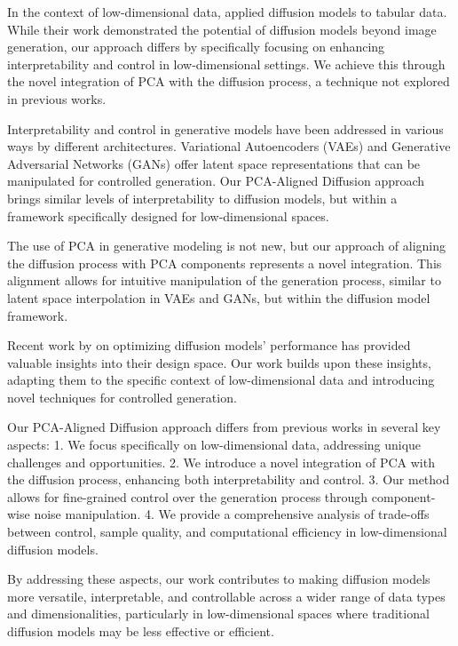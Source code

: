 \documentclass{article} %
\begin{document}
In the context of low-dimensional data, \citet{kotelnikov2022tabddpm} applied diffusion models to tabular data. While their work demonstrated the potential of diffusion models beyond image generation, our approach differs by specifically focusing on enhancing interpretability and control in low-dimensional settings. We achieve this through the novel integration of PCA with the diffusion process, a technique not explored in previous works.

Interpretability and control in generative models have been addressed in various ways by different architectures. Variational Autoencoders (VAEs) \cite{vae} and Generative Adversarial Networks (GANs) \cite{gan} offer latent space representations that can be manipulated for controlled generation. Our PCA-Aligned Diffusion approach brings similar levels of interpretability to diffusion models, but within a framework specifically designed for low-dimensional spaces.

The use of PCA in generative modeling is not new, but our approach of aligning the diffusion process with PCA components represents a novel integration. This alignment allows for intuitive manipulation of the generation process, similar to latent space interpolation in VAEs and GANs, but within the diffusion model framework.

Recent work by \citet{edm} on optimizing diffusion models' performance has provided valuable insights into their design space. Our work builds upon these insights, adapting them to the specific context of low-dimensional data and introducing novel techniques for controlled generation.

Our PCA-Aligned Diffusion approach differs from previous works in several key aspects:
1. We focus specifically on low-dimensional data, addressing unique challenges and opportunities.
2. We introduce a novel integration of PCA with the diffusion process, enhancing both interpretability and control.
3. Our method allows for fine-grained control over the generation process through component-wise noise manipulation.
4. We provide a comprehensive analysis of trade-offs between control, sample quality, and computational efficiency in low-dimensional diffusion models.

By addressing these aspects, our work contributes to making diffusion models more versatile, interpretable, and controllable across a wider range of data types and dimensionalities, particularly in low-dimensional spaces where traditional diffusion models may be less effective or efficient.
\end{document}
